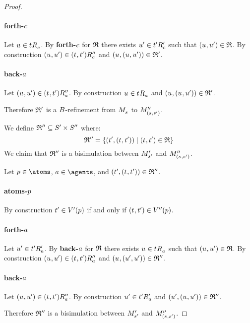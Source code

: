 \begin{proof}
\paragraph{forth-$c$}
Let $\kStateU \in \kSuccessorsC{\kStateT}$.
By {\bf forth-$c$} for $\mathfrak{R}$ there exists ${u}^{\prime} \in {{t}^{\prime}} {R^{\prime}_{c}}$ such that $(\kStateU, \kStateUP) \in \refinement$.
By construction $(\kStateU, \kStateUP) \in \kSuccessorsPPC{(\kStateT, \kStateTP)}$ and $(\kStateU, (\kStateU, \kStateUP)) \in \refinement'$.

\paragraph{back-$a$}
Let $(\kStateU, \kStateUP) \in \kSuccessorsPPA{(\kStateT, \kStateTP)}$.
By construction $\kStateU \in \kSuccessorsA{\kStateT}$ and $(\kStateU, (\kStateU, \kStateUP)) \in \refinement'$.

Therefore $\mathfrak{R}'$ is a $B$-refinement from $\kPModel{\kStateS}$ to $\kPModelPP{(\kStateS, \kStateSP)}$.

We define $\mathfrak{R}'' \subseteq {S^{\prime}} \times {S^{\prime\prime}}$ where:
$$
\bisimulation'' = \{(\kStateTP, (\kStateT, \kStateTP)) \mid (\kStateT, \kStateTP) \in \refinement\}
$$
We claim that $\mathfrak{R}''$ is a bisimulation between ${M^{\prime}_{{s}^{\prime}}}$ and $\kPModelPP{(\kStateS, \kStateSP)}$.

Let $\atomP \in \atoms$, $\agentA \in \agents$, and $(\kStateTP, (\kStateT, \kStateTP)) \in \bisimulation''$.

\paragraph{atoms-$p$}
By construction ${t}^{\prime} \in {V^{\prime}}(p)$ if and only if $(\kStateT, \kStateTP) \in \kValuationPP(\atomP)$.

\paragraph{forth-$a$}
Let ${u}^{\prime} \in {{t}^{\prime}} {R^{\prime}_{a}}$.
By {\bf back-$a$} for $\mathfrak{R}$ there exists $\kStateU \in \kSuccessorsA{\kStateT}$ such that $(\kStateU, \kStateUP) \in \refinement$.
By construction $(\kStateU, \kStateUP) \in \kSuccessorsPPA{(\kStateT, \kStateTP)}$ and $(\kStateU, (\kStateUP, \kStateUP)) \in \bisimulation''$.

\paragraph{back-$a$}
Let $(\kStateU, \kStateUP) \in \kSuccessorsPPA{(\kStateT, \kStateTP)}$.
By construction ${u}^{\prime} \in {{t}^{\prime}} {R^{\prime}_{a}}$ and $(\kStateUP, (\kStateU, \kStateUP)) \in \bisimulation''$.

Therefore $\mathfrak{R}''$ is a bisimulation between ${M^{\prime}_{{s}^{\prime}}}$ and $\kPModelPP{(\kStateS, \kStateSP)}$.
\end{proof}


